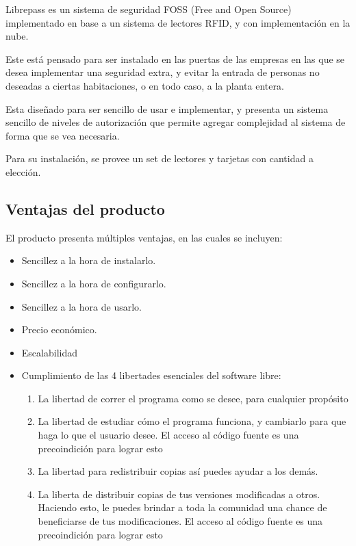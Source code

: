 \documentclass{article}
\begin{document}
Librepass es un sistema de seguridad FOSS (Free and Open Source) implementado en
base a un sistema de lectores RFID, y con implementación en la nube.

Este está pensado para ser instalado en las puertas de las empresas en
las que se desea implementar una seguridad extra, y evitar la entrada de personas
no deseadas a ciertas habitaciones, o en todo caso, a la planta entera.

Esta diseñado para ser sencillo de usar e implementar, y presenta un sistema
sencillo de niveles de autorización que permite agregar complejidad al sistema
de forma que se vea necesaria.

Para su instalación, se provee un set de lectores y tarjetas con cantidad a elección.

\subsection{Ventajas del producto}
El producto presenta múltiples ventajas, en las cuales se incluyen:
\begin{itemize}
	\item Sencillez a la hora de instalarlo.
	\item Sencillez a la hora de configurarlo.
	\item Sencillez a la hora de usarlo.
	\item Precio económico.
	\item Escalabilidad
	\item Cumplimiento de las 4 libertades esenciales del software libre:
	      \begin{enumerate}
		      \item La libertad de correr el programa como se desee, para cualquier propósito
		      \item La libertad de estudiar cómo el programa funciona, y cambiarlo para que
		            haga lo que el usuario desee.
		            El acceso al código fuente es una precoindición para lograr esto
		      \item La libertad para redistribuir copias así puedes ayudar a los demás.
		      \item La liberta de distribuir copias de tus versiones modificadas a otros.
		            Haciendo esto, le puedes brindar a toda la comunidad una chance de beneficiarse
		            de tus modificaciones.
		            El acceso al código fuente es una precoindición para lograr esto
	      \end{enumerate}
\end{itemize}
\end{document}
